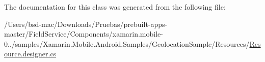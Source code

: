The documentation for this class was generated from the following file\+:\begin{DoxyCompactItemize}
\item 
/\+Users/bsd-\/mac/\+Downloads/\+Pruebas/prebuilt-\/apps-\/master/\+Field\+Service/\+Components/xamarin.\+mobile-\/0../samples/\+Xamarin.\+Mobile.\+Android.\+Samples/\+Geolocation\+Sample/\+Resources/\hyperlink{_components_2xamarin_8mobile-0_86_81_2samples_2_xamarin_8_mobile_8_android_8_samples_2_geolocati70c310c330f4a850881b004033a4fa1f}{Resource.\+designer.\+cs}\end{DoxyCompactItemize}
